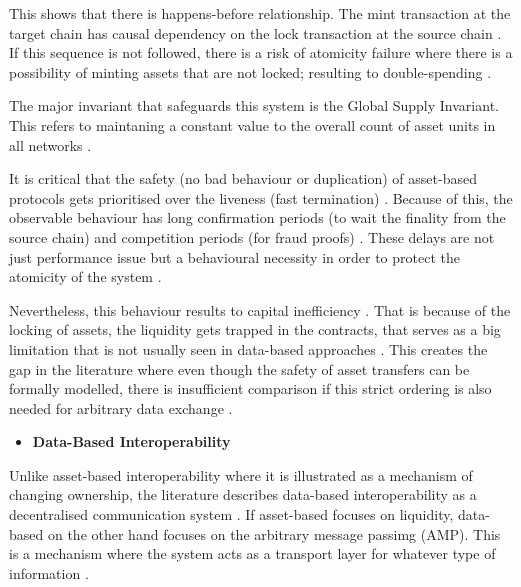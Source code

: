 This shows that there is happens-before relationship. The mint
transaction at the target chain has causal dependency on the lock
transaction at the source chain \citep{Llambas2025} . If this sequence
is not followed, there is a risk of atomicity failure where there is a
possibility of minting assets that are not locked; resulting to
double-spending \citep{Llambas2024patterns} \citep{Belchior_2023}
\citep{deng2025} \citep{Li_2023}.

The major invariant that safeguards this system is the Global Supply
Invariant. This refers to maintaning a constant value to the overall
count of asset units in all networks \citep{Pillai_2022} \citep{Li_2023}
\citep{Bigiotti2025}.

It is critical that the safety (no bad behaviour or duplication) of
asset-based protocols gets prioritised over the liveness (fast
termination) \citep{Llambas2025} \citep{Bigiotti2025}. Because of this,
the observable behaviour has long confirmation periods (to wait the
finality from the source chain) and competition periods (for fraud
proofs) \citep{deng2025} \citep{wang2021sok} \citep{Wang_2023}
\citep{Mao_2023}. These delays are not just performance issue but a
behavioural necessity in order to protect the atomicity of the system
\citep{Chervinski_2023} \citep{lu2024atomicity} \citep{Cheng_2024}.

Nevertheless, this behaviour results to capital inefficiency
\citep{soureshjani2026} \citep{Mohammed_Abdul_2024} \citep{Li2025}. That
is because of the locking of assets, the liquidity gets trapped in the
contracts, that serves as a big limitation that is not usually seen in
data-based approaches \citep{soureshjani2026} \citep{deng2025}
\citep{augusto2025}. This creates the gap in the literature where even
though the safety of asset transfers can be formally modelled, there is
insufficient comparison if this strict ordering is also needed for
arbitrary data exchange \citep{Llambas2025} \citep{Llambas2024eventb}.

\begin{itemize}
\tightlist
\item
  \textbf{Data-Based Interoperability}
\end{itemize}

Unlike asset-based interoperability where it is illustrated as a
mechanism of changing ownership, the literature describes data-based
interoperability as a decentralised communication system
\citep{lu2024atomicity} \citep{Bigiotti2025} \citep{Kotey_2023}. If
asset-based focuses on liquidity, data-based on the other hand focuses
on the arbitrary message passimg (AMP). This is a mechanism where the
system acts as a transport layer for whatever type of information
\citep{Delgado_von_Eitzen_2025} \citep{augusto2025}.

